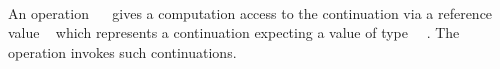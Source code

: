 \begin{code}[hide]%
%
\>[6]\AgdaSpace{}%
\AgdaSpace{}%
\AgdaSpace{}%
\AgdaSpace{}%
\AgdaSpace{}%
\AgdaSpace{}%
\AgdaSymbol{=}\AgdaSpace{}%
\<%
\\
\>[6][@{}l@{\AgdaIndent{0}}]%
\>[8]\AgdaSymbol{(}\AgdaSpace{}%
\AgdaSpace{}%
\AgdaSpace{}%
\AgdaSpace{}%
\AgdaSymbol{(}\AgdaSpace{}%
\AgdaOperator{\AgdaInductiveConstructor{,}}\AgdaSpace{}%
\AgdaOperator{\AgdaFunction{[}}\AgdaSpace{}%
\AgdaSpace{}%
\AgdaOperator{\AgdaFunction{,}}\AgdaSpace{}%
\AgdaSpace{}%
\AgdaOperator{\AgdaFunction{]}}\AgdaSymbol{))}\<%
\\
%
\>[6]\AgdaSpace{}%
\AgdaSpace{}%
\AgdaSpace{}%
\AgdaSpace{}%
\AgdaSpace{}%
\AgdaSpace{}%
\AgdaSymbol{=}\AgdaSpace{}%
\<%
\\
\>[6][@{}l@{\AgdaIndent{0}}]%
\>[8]\AgdaSymbol{(}\AgdaSpace{}%
\AgdaSpace{}%
\AgdaSpace{}%
\AgdaSpace{}%
\AgdaSymbol{(}\AgdaSpace{}%
\AgdaSpace{}%
\AgdaSpace{}%
\AgdaOperator{\AgdaInductiveConstructor{,}}\AgdaSpace{}%
\AgdaSpace{}%
\AgdaSymbol{()))}\<%
\end{code}
%
An operation ~~ gives a computation  access to the continuation  via a reference value ~ which represents a continuation expecting a value of type ~~.
The  operation invokes such continuations.

